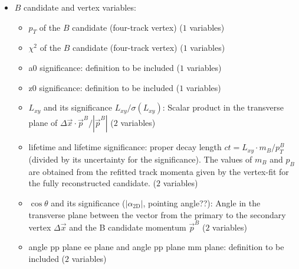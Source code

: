 \begin{itemize}
\item $B$ candidate and vertex variables:
  \begin{itemize}
  \item $p_T$ of the $B$ candidate (four-track vertex) ($1$ variables)
  \item $\chi^2$ of the $B$ candidate (four-track vertex) ($1$ variables)
  \item a0 significance: definition to be included ($1$ variables)
  \item z0 significance: definition to be included ($1$ variables)
  \item $L_{xy}$ and its significance $L_{xy}/\sigma(L_{xy})$:
    Scalar product in the transverse plane of $\Delta \vec{x}\!\cdot\!\vec{p}^{B}/|\vec{p}^{B}|$ ($2$ variables)
  \item lifetime and lifetime significance: proper decay length $ct = L_{xy} \cdot m_B / p_T^B$ (divided by its uncertainty for the significance).
    The values of $m_B$ and $p_B$ are obtained from the refitted track momenta given by the vertex-fit for the fully reconstructed candidate.
    ($2$ variables)
  \item $\cos\theta$ and its significance ($|\alpha_{2\mathrm{D}}|$, pointing angle??):
    Angle in the transverse plane between the vector from the primary to the secondary
    vertex  $\Delta\vec{x}$ and the B candidate momentum $\vec{p}^B$ ($2$ variables)
  \item angle pp plane ee plane and angle pp plane mm plane: definition to be included ($2$ variables)
  \end{itemize}
\end{itemize}


